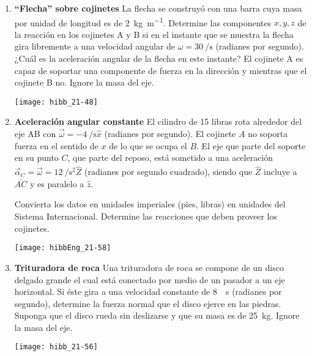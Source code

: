 \documentclass[11pt, spanish, a4paper, twoside]{article}
\begin{document}
\begin{enumerate}
	\item 
	\begin{minipage}[t][4.5cm]{0.55\textwidth}
		\textbf{``Flecha'' sobre cojinetes}
		La flecha se construyó con una barra cuya masa por unidad de longitud es de \SI{2}{\kilo\gram\per\metre}.
		Determine las componentes \(x, y, z\) de la reacción en los cojinetes A y B si en el instante que se muestra la flecha gira libremente a una velocidad angular de \(\omega = \SI{30}{\per\second}\) (radianes por segundo).
		¿Cuál es la aceleración angular de la flecha en este instante?
		El cojinete A es capaz de soportar una componente de fuerza en la dirección y mientras que el cojinete B no.
		Ignore la masa del eje.
	\end{minipage}
	\begin{minipage}[c][0cm][t]{0.4\textwidth}
		\texttt{[image: hibb\_21-48]}
	\end{minipage}


	\item 
	\begin{minipage}[t][6.5cm]{0.65\textwidth}
		\textbf{Aceleración angular constante}
		El cilindro de 15 libras rota alrededor del eje AB con \(\vec{\omega} = -\SI{4}{\per\second} \hat{x}\) (radianes por segundo).
	El cojinete \(A\) no soporta fuerza en el sentido de \(x\) de lo que se ocupa el \(B\).
	El eje que parte del soporte en su punto \(C\), que parte del reposo, está sometido a una aceleración \(\vec{\alpha}_C = \dot{\vec{\omega}} = \SI{12}{\per\second\squared} \hat{Z}\) (radianes por segundo cuadrado), siendo que \(\hat{Z}\) incluye a \(\overline{AC}\) y es paralelo a \(\hat{z}\).
	\begin{tasks}
		\task Convierta los datos en unidades imperiales (pies, libras) en unidades del Sistema Internacional.
		\task Determine las reacciones que deben proveer los cojinetes.
	\end{tasks}
	\end{minipage}
	\begin{minipage}[c][2cm][t]{0.3\textwidth}
		\texttt{[image: hibbEng\_21-58]}
	\end{minipage}


	\item 
	\begin{minipage}[t][3.5cm]{0.65\textwidth}
		\textbf{Trituradora de roca}
		Una trituradora de roca se compone de un disco delgado grande el cual está conectado por medio de un pasador a un eje horizontal.
		Si éste gira a una velocidad constante de \SI{8}{\per\second} (radianes por segundo), determine la fuerza normal que el disco ejerce en las piedras.
		Suponga que el disco rueda sin deslizarse y que su masa es de \SI{25}{\kilo\gram}.
		Ignore la masa del eje.
	\end{minipage}
	\begin{minipage}[c][2cm][t]{0.3\textwidth}
		\texttt{[image: hibb\_21-56]}
	\end{minipage}


\end{enumerate}
\end{document}
